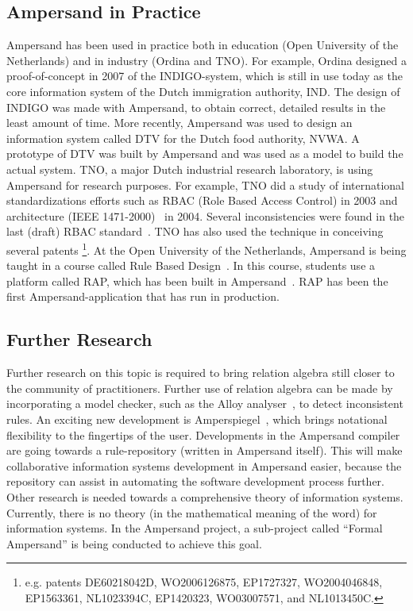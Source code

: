 \documentclass{elsarticle}
\begin{document}
\subsection{Ampersand in Practice}
\label{sct:Ampersand in practice}
	Ampersand has been used in practice both in education (Open University of the Netherlands)
	and in industry (Ordina and TNO).
	For example, Ordina designed a proof-of-concept in 2007 of the INDIGO-system,
	which is still in use today as the core information system of the Dutch immigration authority, IND.
	The design of INDIGO was made with Ampersand, to obtain correct, detailed results in the least amount of time.
	More recently, Ampersand was used to design an information system called DTV for the Dutch food authority, NVWA.
	A prototype of DTV was built by Ampersand and was used as a model to build the actual system.
	TNO, a major Dutch industrial research laboratory, is using Ampersand for research purposes.
	For example, TNO did a study of international standardizations efforts such as
	RBAC (Role Based Access Control) in 2003 and architecture (IEEE 1471-2000)~\cite{IEEE1471} in 2004.
	Several inconsistencies were found in the last (draft) RBAC standard~\cite{RBAC}.
	TNO has also used the technique in conceiving several patents%
\footnote{e.g. patents DE60218042D, WO2006126875, EP1727327, WO2004046848, EP1563361, NL1023394C, EP1420323, WO03007571, and NL1013450C.}.
	At the Open University of the Netherlands, Ampersand is being taught in a course called Rule Based Design~\cite{RBD}.
	In this course, students use a platform called RAP, which has been built in Ampersand~\cite{Michels2015}.
	RAP has been the first Ampersand-application that has run in production.

\subsection{Further Research}
\label{sct:Further Research}
	Further research on this topic is required to bring relation algebra still closer to the community of practitioners.
	Further use of relation algebra can be made by incorporating a model checker, such as the Alloy analyser~\cite{Alloy2006}, to detect inconsistent rules.
	An exciting new development is Amperspiegel~\cite{Amperspiegel}, which brings notational flexibility to the fingertips of the user.
	Developments in the Ampersand compiler are going towards a rule-repository (written in Ampersand itself).
	This will make collaborative information systems development in Ampersand easier, because the repository can assist in automating
	the software development process further.
	Other research is needed towards a comprehensive theory of information systems.
	Currently, there is no theory (in the mathematical meaning of the word) for information systems.
	In the Ampersand project, a sub-project called ``Formal Ampersand'' is being conducted to achieve this goal.
\end{document}

